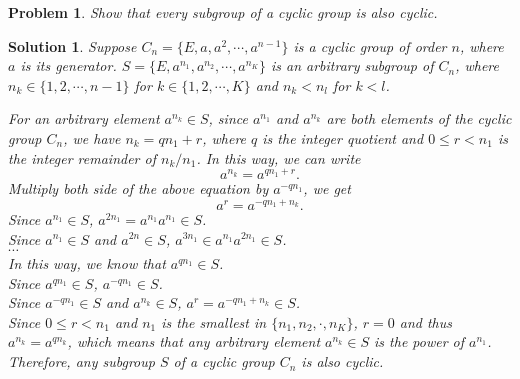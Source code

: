 \documentclass[UTF8,10pt,a4paper]{article}
\theoremstyle{Problem}
\newtheorem{prob}{Problem}
\theoremstyle{Solution}
\newtheorem*{sol}{Solution}
\begin{document}
\begin{prob}
    Show that every subgroup of a cyclic group is also cyclic.
\end{prob}
\begin{sol}
    Suppose $C_n=\{E,a,a^2,\cdots,a^{n-1}\}$ is a cyclic group of order $n$, where $a$ is its generator. $S=\{E,a^{n_1},a^{n_2},\cdots,a^{n_K}\}$ is an arbitrary subgroup of $C_n$, where $n_k\in\{1,2,\cdots,n-1\}$ for $k\in\{1,2,\cdots,K\}$ and $n_k<n_l$ for $k<l$.

    For an arbitrary element $a^{n_k}\in S$, since $a^{n_1}$ and $a^{n_k}$ are both elements of the cyclic group $C_n$, we have $n_k=qn_1+r$, where $q$ is the integer quotient and $0\leq r<n_1$ is the integer remainder of $n_k/n_1$. In this way, we can write
    \begin{equation}
        a^{n_k}=a^{qn_1+r}.
    \end{equation}
    Multiply both side of the above equation by $a^{-qn_1}$, we get
    \begin{equation}
        a^{r}=a^{-qn_1+n_k}.
    \end{equation}
    Since $a^{n_1}\in S$, $a^{2n_1}=a^{n_1}a^{n_1}\in S$.\\
    Since $a^{n_1}\in S$ and $a^{2n}\in S$, $a^{3n_1}\in a^{n_1}a^{2n_1}\in S$.\\
    $\cdots$\\
    In this way, we know that $a^{qn_1}\in S$.\\
    Since $a^{qn_1}\in S$, $a^{-qn_1}\in S$.\\
    Since $a^{-qn_1}\in S$ and $a^{n_k}\in S$, $a^r=a^{-qn_1+n_k}\in S$.\\
    Since $0\leq r<n_1$ and $n_1$ is the smallest in $\{n_1,n_2,\cdot,n_K\}$, $r=0$ and thus $a^{n_k}=a^{qn_k}$, which means that any arbitrary element $a^{n_k}\in S$ is the power of $a^{n_1}$.\\
    Therefore, any subgroup $S$ of a cyclic group $C_n$ is also cyclic.
\end{sol}
\end{document}
